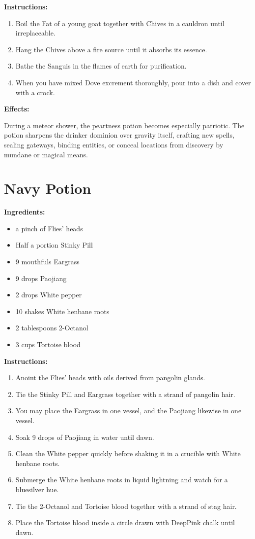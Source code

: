 \documentclass{article}
\begin{document}
\textbf{Instructions:}

\begin{enumerate}
  \item Boil the Fat of a young goat together with Chives in a cauldron until irreplaceable.
  \item Hang the Chives above a fire source until it absorbs its essence.
  \item Bathe the Sanguis in the flames of earth for purification.
  \item When you have mixed Dove excrement thoroughly, pour into a dish and cover with a crock.
\end{enumerate}

\textbf{Effects:}

During a meteor shower, the peartness potion becomes especially patriotic. The potion sharpens the drinker dominion over gravity itself, crafting new spells, sealing gateways, binding entities, or conceal locations from discovery by mundane or magical means.

\newpage
\section*{Navy Potion}

\textbf{Ingredients:}

\begin{itemize}
  \item a pinch of Flies' heads
  \item Half a portion Stinky Pill
  \item 9 mouthfuls Eargrass
  \item 9 drops Paojiang
  \item 2 drops White pepper
  \item 10 shakes White henbane roots
  \item 2 tablespoons 2-Octanol
  \item 3 cups Tortoise blood
\end{itemize}

\textbf{Instructions:}

\begin{enumerate}
  \item Anoint the Flies' heads with oils derived from pangolin glands.
  \item Tie the Stinky Pill and Eargrass together with a strand of pangolin hair.
  \item You may place the Eargrass in one vessel, and the Paojiang likewise in one vessel.
  \item Soak 9 drops of Paojiang in water until dawn.
  \item Clean the White pepper quickly before shaking it in a crucible with White henbane roots.
  \item Submerge the White henbane roots in liquid lightning and watch for a bluesilver hue.
  \item Tie the 2-Octanol and Tortoise blood together with a strand of stag hair.
  \item Place the Tortoise blood inside a circle drawn with DeepPink chalk until dawn.
\end{enumerate}
\end{document}
